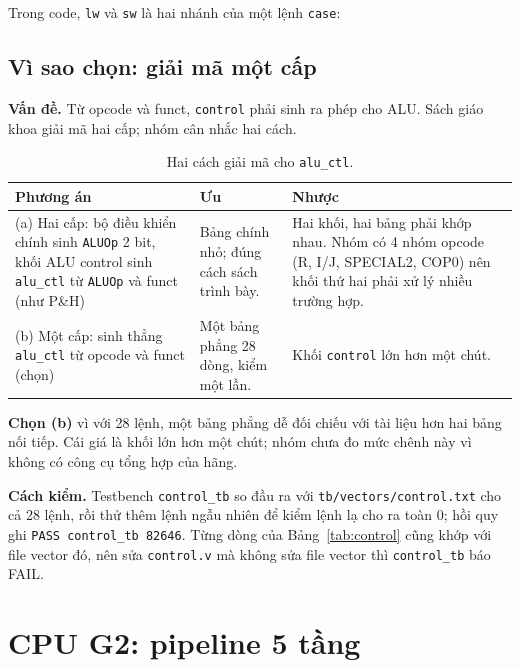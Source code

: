 Trong code, \texttt{lw} và \texttt{sw} là hai nhánh của một lệnh \texttt{case}:

\subsection{Vì sao chọn: giải mã một cấp}\label{sec:vi-sao-control}
\textbf{Vấn đề.} Từ opcode và funct, \texttt{control} phải sinh ra phép cho ALU. Sách giáo khoa giải mã hai cấp; nhóm cân nhắc hai cách.

\begin{table}[htbp]
\centering\small
\begin{tabular}{@{}p{4.3cm} p{4.6cm} p{4.6cm}@{}}
\toprule
Phương án & Ưu & Nhược \\
\midrule
(a) Hai cấp: bộ điều khiển chính sinh \texttt{ALUOp} 2 bit, khối ALU control sinh \texttt{alu\_ctl} từ \texttt{ALUOp} và funct (như P\&H) & Bảng chính nhỏ; đúng cách sách trình bày. & Hai khối, hai bảng phải khớp nhau. Nhóm có 4 nhóm opcode (R, I/J, SPECIAL2, COP0) nên khối thứ hai phải xử lý nhiều trường hợp. \\
(b) Một cấp: sinh thẳng \texttt{alu\_ctl} từ opcode và funct (chọn) & Một bảng phẳng 28 dòng, kiểm một lần. & Khối \texttt{control} lớn hơn một chút. \\
\bottomrule
\end{tabular}
\caption{Hai cách giải mã cho \texttt{alu\_ctl}.}\label{tab:vi-sao-control}
\end{table}

\textbf{Chọn (b)} vì với 28 lệnh, một bảng phẳng dễ đối chiếu với tài liệu hơn hai bảng nối tiếp. Cái giá là khối lớn hơn một chút; nhóm chưa đo mức chênh này vì không có công cụ tổng hợp của hãng.

\textbf{Cách kiểm.} Testbench \texttt{control\_tb} so đầu ra với \texttt{tb/vectors/control.txt} cho cả 28 lệnh, rồi thử thêm lệnh ngẫu nhiên để kiểm lệnh lạ cho ra toàn 0; hồi quy ghi \texttt{PASS control\_tb 82646}. Từng dòng của Bảng~\ref{tab:control} cũng khớp với file vector đó, nên sửa \texttt{control.v} mà không sửa file vector thì \texttt{control\_tb} báo FAIL.

\section{CPU G2: pipeline 5 tầng}

